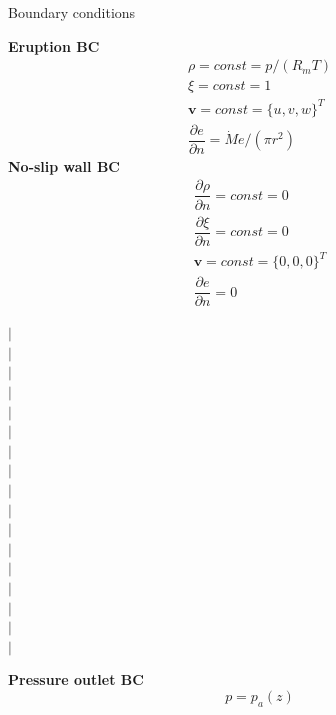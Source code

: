 \documentclass{beamer}
\begin{document}
\begin{frame}{Boundary conditions}
\noindent
\begin{minipage}{.41\textwidth}
\textbf{Eruption BC}
\begin{align}
\rho =const = p/\left(R_m T\right) \label{eq:erupt_bc_rho} \\
\xi=const=1 \label{eq:erupt_bc_xi}\\
\textbf{v} = const =\{u,v,w\}^T \label{eq:erupt_bc_v}\\
\dfrac{\partial e}{\partial n}=\dot M e /\left(\pi r^2\right) \label{eq:erupt_bc_e}
\end{align} 
\textbf{No-slip wall BC}
\begin{align}
\dfrac{\partial \rho}{\partial n} = const = 0\label{eq:wall_bc_rho} \\
\dfrac{\partial \xi}{\partial n} = const = 0 \label{eq:wall_bc_xi}\\ 
\textbf{v} = const =\{0,0,0\}^T \label{eq:wall_bc_v}\\
\dfrac{\partial e }{\partial n} = 0\label{eq:wall_bc_e}
\end{align} 
\end{minipage} %
%
\begin{minipage}{.01\textwidth}
$\vert$\\
$\vert$\\
$\vert$\\
$\vert$\\
$\vert$\\
$\vert$\\
$\vert$\\
$\vert$\\
$\vert$\\
$\vert$\\
$\vert$\\
$\vert$\\
$\vert$\\
$\vert$\\
$\vert$\\
$\vert$\\
$\vert$\\
\end{minipage}
\begin{minipage}{.560\textwidth}
\begin{minipage}[!t]{\textwidth}
\textbf{Pressure outlet BC}
\begin{equation}
p = p_a\left(z\right)\label{eq:pressure_bc_p} 
\end{equation} 
\end{minipage}

\end{minipage}
\end{frame}
\end{document}
